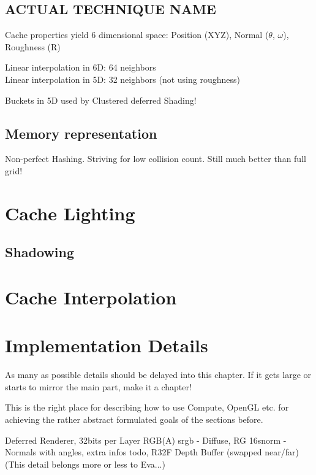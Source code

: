 \documentclass[thesis.tex]{subfiles}
\begin{document}
\subsection{ACTUAL TECHNIQUE NAME}
Cache properties yield 6 dimensional space: Position (XYZ), Normal ($\theta$, $\omega$), Roughness (R)

Linear interpolation in 6D: 64 neighbors\\
Linear interpolation in 5D: 32 neighbors (not using roughness)

Buckets in 5D used by Clustered deferred Shading!



\subsection{Memory representation}
Non-perfect Hashing. Striving for low collision count.
Still much better than full grid!

\section{Cache Lighting}

\subsection{Shadowing}

\section{Cache Interpolation}



\section{Implementation Details}

As many as possible details should be delayed into this chapter. If it gets large or starts to mirror the main part, make it a chapter!

This is the right place for describing how to use Compute, OpenGL etc. for achieving the rather abstract formulated goals of the sections before.

Deferred Renderer, 32bits per Layer RGB(A) srgb - Diffuse, RG 16snorm - Normals with angles, extra infos todo, R32F Depth Buffer (swapped near/far)\\
(This detail belongs more or less to Eva...)

\subfilebib %
\end{document}
